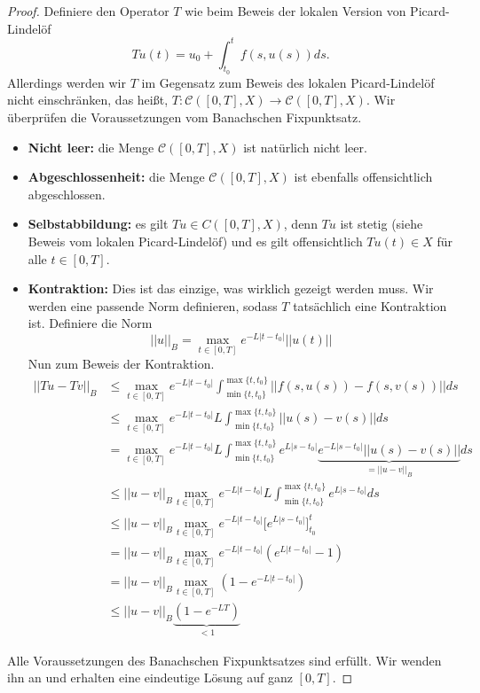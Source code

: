 \documentclass[a4paper]{article}
\theoremstyle{definition}
\begin{document}
\begin{proof}
Definiere den Operator $T$ wie beim Beweis der lokalen Version von Picard-Lindelöf
\[
    Tu(t) = u_0 + \int^t_{t_0} f(s, u(s)) ds.
\]
Allerdings werden wir $T$ im Gegensatz zum Beweis des lokalen Picard-Lindelöf nicht einschränken, das heißt, $T: \mathcal C([0,T], X) \to \mathcal C([0,T], X)$. Wir überprüfen die Voraussetzungen vom Banachschen Fixpunktsatz.

\begin{itemize}
    \item \textbf{Nicht leer:} die Menge $\mathcal C([0,T], X)$ ist natürlich nicht leer.
    \item \textbf{Abgeschlossenheit:} die Menge $\mathcal C([0,T], X)$ ist ebenfalls offensichtlich abgeschlossen.
    \item \textbf{Selbstabbildung:} es gilt $Tu \in C([0,T], X)$, denn $Tu$ ist stetig (siehe Beweis vom lokalen Picard-Lindelöf) und es gilt offensichtlich $Tu(t) \in X$ für alle $t \in [0,T]$.
    \item \textbf{Kontraktion:} Dies ist das einzige, was wirklich gezeigt werden muss. Wir werden eine passende Norm definieren, sodass $T$ tatsächlich eine Kontraktion ist. Definiere die Norm
    \[
        ||u||_B = \max_{t \in [0,T]} e^{-L|t-t_0|}||u(t)|| 
    \]
    Nun zum Beweis der Kontraktion.
    \begin{align*}
        ||Tu-Tv||_{B} &\leq \max_{t \in [0,T]} e^{-L|t-t_0|} \int^{\max\{t,t_0\}}_{\min\{t,t_0\}} ||f(s,u(s)) - f(s,v(s))|| ds\\
        &\leq \max_{t \in [0,T]} e^{-L|t-t_0|} L \int^{\max\{t,t_0\}}_{\min\{t,t_0\}} ||u(s) - v(s)|| ds \\
        &=  \max_{t \in [0,T]} e^{-L|t-t_0|} L \int^{\max\{t,t_0\}}_{\min\{t,t_0\}}  e^{L|s-t_0|} \underbrace{e^{-L|s-t_0|} ||u(s) - v(s)||}_{=||u-v||_B} ds \\
        &\leq ||u-v||_B \max_{t \in [0,T]} e^{-L|t-t_0|} L  \int^{\max\{t,t_0\}}_{\min\{t,t_0\}}  e^{L|s-t_0|}ds \\
        &\leq ||u-v||_B \max_{t \in [0,T]} e^{-L|t-t_0|} \big[e^{L|s-t_0|}\big]^t_{t_0} \\
        &= ||u-v||_B \max_{t \in [0,T]} e^{-L|t-t_0|}(e^{L|t-t_0|} - 1) \\
        &= ||u-v||_B \max_{t \in [0,T]} (1 - e^{-L|t-t_0|}) \\
        &\leq ||u-v||_B \underbrace{(1 - e^{-LT})}_{< 1}
    \end{align*}
\end{itemize}
Alle Voraussetzungen des Banachschen Fixpunktsatzes sind erfüllt. Wir wenden ihn an und erhalten eine eindeutige Lösung auf ganz $[0,T]$.
\end{proof}
\end{document}
